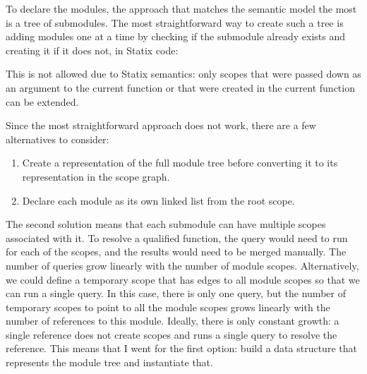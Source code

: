 To declare the modules, the approach that matches the semantic model the most is a tree of submodules.
The most straightforward way to create such a tree is adding modules one at a time by checking if the submodule already exists and creating it if it does not, in Statix code:

  
This is not allowed due to Statix semantics: only scopes that were passed down as an argument to the current function or that were created in the current function can be extended.

Since the most straightforward approach does not work, there are a few alternatives to consider:
\begin{enumerate}
  \item Create a representation of the full module tree before converting it to its representation in the scope graph.
  \item Declare each module as its own linked list from the root scope.
\end{enumerate}

The second solution means that each submodule can have multiple scopes associated with it.
To resolve a qualified function, the query would need to run for each of the scopes, and the results would need to be merged manually.
The number of queries grow linearly with the number of module scopes.
Alternatively, we could define a temporary scope that has  edges to all module scopes so that we can run a single query.
In this case, there is only one query, but the number of temporary scopes to point to all the module scopes grows linearly with the number of references to this module.
Ideally, there is only constant growth: a single reference does not create scopes and runs a single query to resolve the reference.
This means that I went for the first option: build a data structure that represents the module tree and instantiate that.

